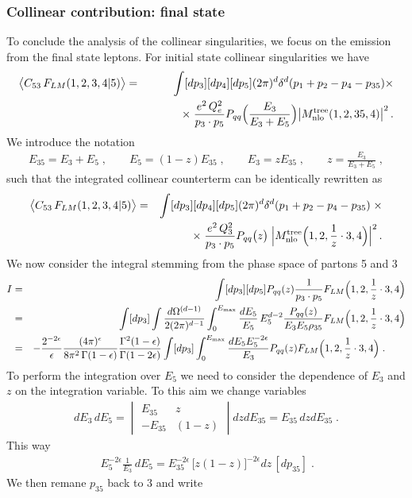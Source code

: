 \documentclass[12pt,a4paper]{article}
\newcommand{\nn}{\nonumber}
\newcommand{\eps}{\epsilon}
\newcommand{\beq}{\begin{eqnarray}}
\newcommand{\eeq}{\end{eqnarray}}
\begin{document}
 \subsubsection{Collinear contribution: final state}
 To conclude the analysis of the collinear singularities, we focus on 
 the emission from the final state leptons.
 For initial state collinear singularities we have
 \beq
\big\langle C_{53} \, F_{LM}(1,2,3,4|5) \big\rangle
&=& \int [dp_3][dp_4][dp_5]
(2\pi)^d \delta^d(p_1+p_2-p_4-p_{35})  \times
\nn \\
&& \qquad \quad 
\times \;  \frac{e^2\, Q_e^2}{p_3\cdot p_5} P_{qq} \Big( \frac{E_3}{E_3+E_5}\Big) \big| M_{\rm nlo}^{\rm tree}(1, 2, 35, 4)\big|^2 \, .
 \eeq
We introduce the notation
 \beq
 E_{35}= E_3+E_5 \; ,
 \qquad
 E_5=(1-z) E_{35} \; ,
 \qquad  
 E_3 = z E_{35} \; ,
 \qquad
 z = \frac{E_3}{E_3+E_5} \; ,
 \eeq
 such that the integrated collinear counterterm can be identically rewritten as 
 \beq
\big\langle C_{53} \, F_{LM}(1,2,3,4|5) \big\rangle
&=& \int [dp_3][dp_4][dp_5]
(2\pi)^d \delta^d(p_1+p_2-p_4-p_{35}) \;  \times
\nn \\
&& \qquad \quad 
\times \;  \frac{e^2\, Q_3^2}{p_3\cdot p_5} P_{qq} \big(z\big) \; 
\Big| M_{\rm nlo}^{\rm tree}\Big(1, 2, \frac1z \cdot  3, 4\Big)\Big|^2 \, .
 \eeq
 We now consider the integral stemming from the phase space of partons 5 and 3
 \beq
 I
 &=&
 \int [dp_3][dp_5] P_{qq}(z) \frac{1}{p_3 \cdot p_5} F_{LM}\Big(1, 2, \frac1z \cdot  3, 4\Big)
 \nn \\
 &=&
  \int [dp_3]
  \int \frac{d\Omega^{(d-1)}}{2(2\pi)^{d-1}}
  \int_0^{E_{\rm max}}
  \frac{dE_5}{E_5} \, E_5^{d-2}
  \frac{P_{qq}(z)}{E_3 E_5 \rho_{35}} F_{LM}\Big(1, 2, \frac1z \cdot  3, 4\Big)
  \nn \\
  &=&
  -\frac{2^{-2\eps}}{\eps}
  \frac{(4\pi)^\eps}{8\pi^2 \,  \Gamma(1-\eps)}
  \frac{\Gamma^2(1-\eps)}{\Gamma(1-2\eps)}
  \int [dp_3]
  \int_0^{E_{\rm max}}
\frac{ dE_5E_5^{-2\eps}}{E_3}
P_{qq}(z)F_{LM}\Big(1, 2, \frac1z \cdot  3, 4\Big)  \;.
\qquad 
 \eeq
 To perform the integration over $E_5$ we need to consider the dependence of $E_3$ and $z$ on 
 the integration variable. To this aim we change variables
 \beq
 dE_3 \, dE_5 = 
 \begin{vmatrix}
E_{35} & z \\
-E_{35} & (1-z)
\end{vmatrix}
dz dE_{35}
=E_{35}  \, dz dE_{35} \; .
 \eeq
 This way
 \beq
 [dp_3] \, E_5^{-2\eps} \frac1{E_3} \, dE_5 =
 E_{35}^{-2\eps} \, 
 \big[ z(1-z)\big]^{-2\eps}
 dz \, [dp_{35}] \; .
 \eeq
 We then remane $p_{35}$ back to 3 and write
\end{document}
